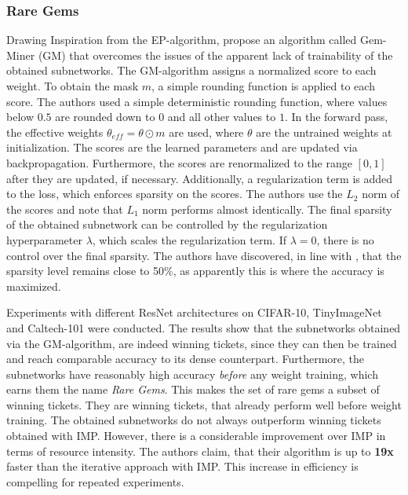 \subsubsection{Rare Gems}
Drawing Inspiration from the EP-algorithm, \textcite{RareGems} propose an algorithm called Gem-Miner (GM) that overcomes the issues of the apparent lack of trainability of the obtained subnetworks.
The GM-algorithm assigns a normalized score to each weight. 
To obtain the mask $m$, a simple rounding function is applied to each score. The authors used a simple deterministic rounding function, where values below $0.5$ are rounded down to $0$ and all other values to $1$.
In the forward pass, the effective weights $\theta_{eff} = \theta \odot m$ are used, where $\theta$ are the untrained weights at initialization. 
The scores are the learned parameters and are updated via backpropagation.
Furthermore, the scores are renormalized to the range $[0,1]$ after they are updated, if necessary.
Additionally, a regularization term is added to the loss, which enforces sparsity on the scores. 
The authors use the $L_2$ norm of the scores and note that $L_1$ norm performs almost identically.
The final sparsity of the obtained subnetwork can be controlled by the regularization hyperparameter $\lambda$, which scales the regularization term.
 If $\lambda = 0$, there is no control over the final sparsity. 
 The authors have discovered, in line with \cite{DBLP:conf/cvpr/RamanujanWKFR20}, that the sparsity level remains close to 50\%, as apparently this is where the accuracy is maximized.

Experiments with different ResNet architectures on CIFAR-10, TinyImageNet \autocite{Tinyimagenet} and Caltech-101 \autocite{Caltech101} were conducted. 
The results show that the subnetworks obtained via the GM-algorithm, are indeed winning tickets, since they can then be trained and reach comparable accuracy to its dense counterpart.
Furthermore, the subnetworks have reasonably high accuracy \textit{before} any weight training, which earns them the name \textit{Rare Gems}. 
This makes the set of rare gems a subset of winning tickets. 
They are winning tickets, that already perform well before weight training.
The obtained subnetworks do not always outperform winning tickets obtained with IMP.
However, there is a considerable improvement over IMP in terms of resource intensity.
The authors claim, that their algorithm is up to \textbf{19x} faster than the iterative approach with IMP. 
This increase in efficiency is compelling for repeated experiments.

